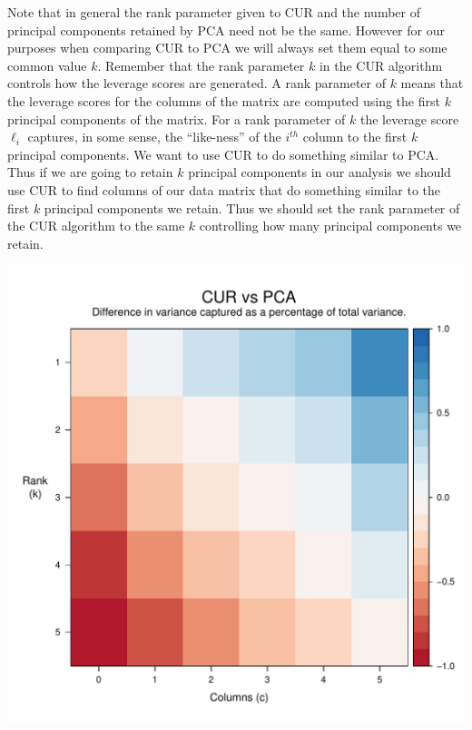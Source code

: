 \documentclass{book}
\begin{document}
Note that in general the rank parameter given to CUR and the number of principal components retained by PCA need not be the same. However for our purposes when comparing CUR to PCA we will always set them equal to some common value $k$. Remember that the rank parameter $k$ in the CUR algorithm controls how the leverage scores are generated. A rank parameter of $k$ means that the leverage scores for the columns of the matrix are computed using the first $k$ principal components of the matrix. For a rank parameter of $k$ the leverage score $\ell_i$ captures, in some sense, the ``like-ness'' of the $i^{th}$ column to the first $k$ principal components. We want to use CUR to do something similar to PCA. Thus if we are going to retain $k$ principal components in our analysis we should use CUR to find columns of our data matrix that do something similar to the first $k$ principal components we retain. Thus we should set the rank parameter of the CUR algorithm to the same $k$ controlling how many principal components we retain. 

\begin{center}
\includegraphics[scale=.75]{./Figures/diag_ex_1_raster.pdf}%
\end{center}
\end{document}

